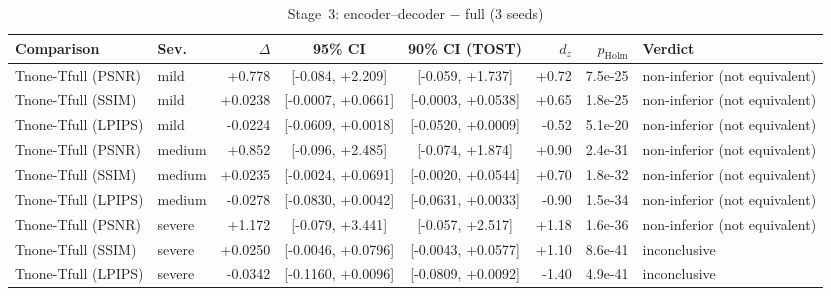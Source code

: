 \begin{table}[t]
\centering
\caption{Stage~3: encoder--decoder $-$ full (3 seeds)}
\label{tab:convergence_stats}
\scriptsize
\setlength{\tabcolsep}{3pt}
\begin{tabular}{llrccrrl}
\toprule
Comparison & Sev. & $\Delta$ & 95\% CI & 90\% CI (TOST) & $d_z$ & $p_\mathrm{Holm}$ & Verdict \\
\midrule
Tnone-Tfull (PSNR) & mild & +0.778 & [-0.084, +2.209] & [-0.059, +1.737] & +0.72 & 7.5e-25 & non-inferior (not equivalent) \\
Tnone-Tfull (SSIM) & mild & +0.0238 & [-0.0007, +0.0661] & [-0.0003, +0.0538] & +0.65 & 1.8e-25 & non-inferior (not equivalent) \\
Tnone-Tfull (LPIPS) & mild & -0.0224 & [-0.0609, +0.0018] & [-0.0520, +0.0009] & -0.52 & 5.1e-20 & non-inferior (not equivalent) \\
Tnone-Tfull (PSNR) & medium & +0.852 & [-0.096, +2.485] & [-0.074, +1.874] & +0.90 & 2.4e-31 & non-inferior (not equivalent) \\
Tnone-Tfull (SSIM) & medium & +0.0235 & [-0.0024, +0.0691] & [-0.0020, +0.0544] & +0.70 & 1.8e-32 & non-inferior (not equivalent) \\
Tnone-Tfull (LPIPS) & medium & -0.0278 & [-0.0830, +0.0042] & [-0.0631, +0.0033] & -0.90 & 1.5e-34 & non-inferior (not equivalent) \\
Tnone-Tfull (PSNR) & severe & +1.172 & [-0.079, +3.441] & [-0.057, +2.517] & +1.18 & 1.6e-36 & non-inferior (not equivalent) \\
Tnone-Tfull (SSIM) & severe & +0.0250 & [-0.0046, +0.0796] & [-0.0043, +0.0577] & +1.10 & 8.6e-41 & inconclusive \\
Tnone-Tfull (LPIPS) & severe & -0.0342 & [-0.1160, +0.0096] & [-0.0809, +0.0092] & -1.40 & 4.9e-41 & inconclusive \\
\bottomrule
\end{tabular}
\end{table}
